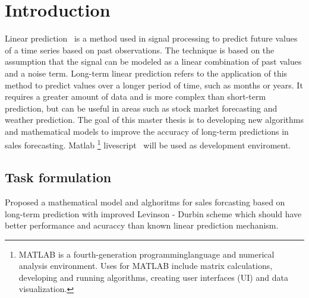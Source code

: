 
{}

\chapter*{Introduction}

Linear prediction~\cite{Vaidyanathan} is a method used in signal processing to predict future values of a time series based on past observations.
The technique is based on the assumption that the signal can be modeled as a linear combination of past values and a noise term.
Long-term linear prediction refers to the application of this method to predict values over a longer period of time, such as months or years.
It requires a greater amount of data and is more complex than short-term prediction, but can be useful in areas such as stock market forecasting and
weather prediction. The goal of this master thesis is to developing new algorithms and mathematical models to improve the accuracy of long-term predictions
in sales forecasting. Matlab \footnote{MATLAB is a fourth-generation programminglanguage and numerical analysis environment.
Uses for MATLAB include matrix calculations, developing and running algorithms, creating user interfaces (UI) and data visualization.}
livescript~\cite{livescript} will be used as development enviroment.

\section*{Task formulation}

Proposed a mathematical model and alghoritms for sales forcasting based on long-term prediction with improved Levinson - Durbin scheme 
which should have better performance and acuraccy than known linear prediction mechanism.
